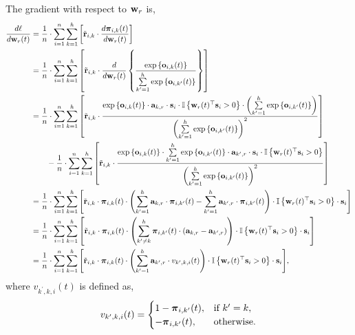 \documentclass[10pt]{article}
\begin{document}
The gradient with respect to ${\mathbf{w}}_r$ is,
\begin{equation*}
\begin{split}
	\frac{d\ell}{d {\mathbf{w}}_r(t)} &= \frac{1}{n} \cdot \sum\limits_{i=1}^{n}{ \sum\limits_{k=1}^{h}\left[ {\tilde{\mathbf{r}}}_{i,k} \cdot \frac{d {\boldsymbol{\pi}}_{i,k}(t)}{d {\mathbf{w}}_r(t)} \right] } \\
	&= \frac{1}{n} \cdot \sum\limits_{i=1}^{n}{ \sum\limits_{k=1}^{h}\left[ {\tilde{\mathbf{r}}}_{i,k} \cdot \frac{d}{d {\mathbf{w}}_r(t)} \left\{ \frac{\exp\left\{ {\mathbf{o}}_{i,k}(t) \right\}}{\sum\limits_{k^\prime = 1}^{h}{\exp\left\{ {\mathbf{o}}_{i,k^\prime}(t) \right\}}} \right\} \right] } \\
	&= \frac{1}{n} \cdot \sum\limits_{i=1}^{n}{ \sum\limits_{k=1}^{h}\left[ {\tilde{\mathbf{r}}}_{i,k} \cdot \frac{ \exp\left\{ {\mathbf{o}}_{i,k}(t) \right\} \cdot {\mathbf{a}}_{k,r} \cdot {\mathbf{s}}_i \cdot {\mathbb{I}}\left\{ {\mathbf{w}}_r(t)^\top {\mathbf{s}}_i > 0 \right\} \cdot \left( \sum\limits_{k^\prime = 1}^{h}{\exp\left\{ {\mathbf{o}}_{i,k^\prime}(t) \right\}} \right) }{ \left( \sum\limits_{k^\prime = 1}^{h}{\exp\left\{ {\mathbf{o}}_{i,k^\prime}(t) \right\}} \right)^2 } \right] } \\
	&\qquad - \frac{1}{n} \cdot \sum\limits_{i=1}^{n}{ \sum\limits_{k=1}^{h}\left[ {\tilde{\mathbf{r}}}_{i,k} \cdot \frac{ \exp\left\{ {\mathbf{o}}_{i,k}(t) \right\} \cdot \sum\limits_{k^\prime = 1}^{h}{\exp\left\{ {\mathbf{o}}_{i,k^\prime}(t) \right\}} \cdot {\mathbf{a}}_{k^\prime,r} \cdot {\mathbf{s}}_i \cdot {\mathbb{I}}\left\{ {\mathbf{w}}_r(t)^\top {\mathbf{s}}_i > 0 \right\} }{ \left( \sum\limits_{k^\prime = 1}^{h}{\exp\left\{ {\mathbf{o}}_{i,k^\prime}(t) \right\}} \right)^2 } \right] } \\
	&= \frac{1}{n} \cdot \sum\limits_{i=1}^{n}{ \sum\limits_{k=1}^{h}{ \left[ {\tilde{\mathbf{r}}}_{i,k} \cdot {\boldsymbol{\pi}}_{i,k}(t) \cdot \left( \sum\limits_{k^\prime = 1}^{h}{ {\mathbf{a}}_{k,r} \cdot {\boldsymbol{\pi}}_{i,k^\prime}(t) } - \sum\limits_{k^\prime = 1}^{h}{ {\mathbf{a}}_{k^\prime,r} \cdot {\boldsymbol{\pi}}_{i,k^\prime}(t) } \right) \cdot {\mathbb{I}}\left\{ {\mathbf{w}}_r(t)^\top {\mathbf{s}}_i > 0 \right\} \cdot {\mathbf{s}}_i \right] } } \\
	&= \frac{1}{n} \cdot \sum\limits_{i=1}^{n}{ \sum\limits_{k=1}^{h}{ \left[ {\tilde{\mathbf{r}}}_{i,k} \cdot {\boldsymbol{\pi}}_{i,k}(t) \cdot \left( \sum\limits_{k^\prime \not= k}^{h}{ {\boldsymbol{\pi}}_{i,k^\prime}(t) \cdot \left( {\mathbf{a}}_{k,r} - {\mathbf{a}}_{k^\prime,r} \right)  } \right) \cdot {\mathbb{I}}\left\{ {\mathbf{w}}_r(t)^\top {\mathbf{s}}_i > 0 \right\} \cdot {\mathbf{s}}_i \right] } } \\
	&= \frac{1}{n} \cdot \sum\limits_{i=1}^{n}{ \sum\limits_{k=1}^{h}{ \left[ {\tilde{\mathbf{r}}}_{i,k} \cdot {\boldsymbol{\pi}}_{i,k}(t) \cdot \left( \sum\limits_{k^\prime = 1}^{h}{ {\mathbf{a}}_{k^\prime,r}  \cdot v_{k^\prime,k,i}(t) } \right) \cdot {\mathbb{I}}\left\{ {\mathbf{w}}_r(t)^\top {\mathbf{s}}_i > 0 \right\} \cdot {\mathbf{s}}_i \right] } },
\end{split}
\end{equation*}
where $v_{k^\prime,k,i}(t)$ is defined as,
\begin{equation*}
	v_{k^\prime,k,i}(t) = \begin{cases}
    1 - {\boldsymbol{\pi}}_{i,k^\prime}(t), & \text{if $k^\prime = k$}, \\
    - {\boldsymbol{\pi}}_{i,k^\prime}(t), & \text{otherwise}.
  \end{cases}
\end{equation*}
\end{document}

